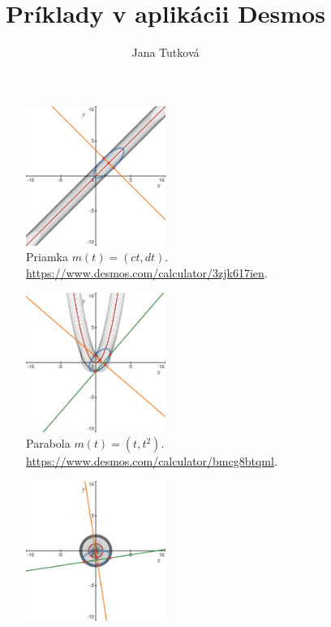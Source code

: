 \documentclass{article}
\title{Príklady v aplikácii Desmos}
\author{Jana Tutková}
\begin{document}
\maketitle
\begin{figure}[h]
	\centering
    \captionsetup{justification=centering}
	\captionsetup[subfigure]{justification=centering}
	\begin{subfigure}[t]{0.49\textwidth}
		\centering
		\includegraphics[width=0.5\textwidth]{images/line_desmos.png}
		\caption{Priamka $m(t)=(ct, dt).$ \\
		\url{https://www.desmos.com/calculator/3zjk617ien}.}
		\label{fig:priamka}
	\end{subfigure}
    \hfill
    \begin{subfigure}[t]{0.49\textwidth}
        \centering
		\includegraphics[width=0.5\textwidth]{images/parabola_desmos.png}
		\caption{Parabola $m(t)=(t, t^2).$ \\
		\url{https://www.desmos.com/calculator/bmcg8btqml}.}
		\label{fig:parabola}
	\end{subfigure}
    \hfill
    \begin{subfigure}[t]{0.49\textwidth}
        \centering
		\includegraphics[width=0.5\textwidth]{images/kruznica_desmos.png}

\end{subfigure}
\end{figure}
\end{document}
